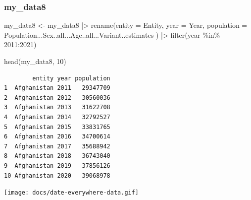 \documentclass[
  11pt,
  a4paper,
  DIV=11,
  numbers=noendperiod]{scrartcl}
\newenvironment{Shaded}{\begin{snugshade}}{\end{snugshade}}
\newcommand{\AttributeTok}[1]{\textcolor[rgb]{0.40,0.45,0.13}{#1}}
\newcommand{\DecValTok}[1]{\textcolor[rgb]{0.68,0.00,0.00}{#1}}
\newcommand{\FunctionTok}[1]{\textcolor[rgb]{0.28,0.35,0.67}{#1}}
\newcommand{\NormalTok}[1]{\textcolor[rgb]{0.00,0.23,0.31}{#1}}
\newcommand{\OtherTok}[1]{\textcolor[rgb]{0.00,0.23,0.31}{#1}}
\newcommand{\SpecialCharTok}[1]{\textcolor[rgb]{0.37,0.37,0.37}{#1}}
\begin{document}
\subsubsection{my\_data8}\label{my_data8}

\begin{Shaded}
\begin{Highlighting}[]
\NormalTok{my\_data8 }\OtherTok{\textless{}{-}}\NormalTok{ my\_data8 }\SpecialCharTok{|\textgreater{}}
  \FunctionTok{rename}\NormalTok{(}\AttributeTok{entity =}\NormalTok{ Entity,}
         \AttributeTok{year =}\NormalTok{ Year,}
         \AttributeTok{population =}\NormalTok{ Population...Sex..all...Age..all...Variant..estimates}
\NormalTok{         ) }\SpecialCharTok{|\textgreater{}}
  \FunctionTok{filter}\NormalTok{(year }\SpecialCharTok{\%in\%} \DecValTok{2011}\SpecialCharTok{:}\DecValTok{2021}\NormalTok{)}

\FunctionTok{head}\NormalTok{(my\_data8, }\DecValTok{10}\NormalTok{)}
\end{Highlighting}
\end{Shaded}

\begin{verbatim}
        entity year population
1  Afghanistan 2011   29347709
2  Afghanistan 2012   30560036
3  Afghanistan 2013   31622708
4  Afghanistan 2014   32792527
5  Afghanistan 2015   33831765
6  Afghanistan 2016   34700614
7  Afghanistan 2017   35688942
8  Afghanistan 2018   36743040
9  Afghanistan 2019   37856126
10 Afghanistan 2020   39068978
\end{verbatim}

\begin{center}
\texttt{[image: docs/date-everywhere-data.gif]}
\end{center}
\end{document}
